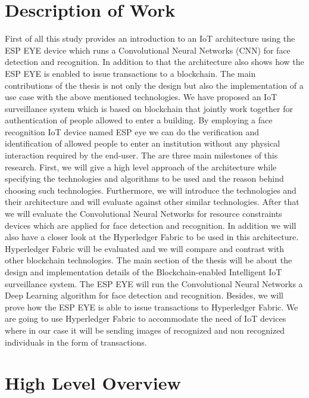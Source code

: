 \section{Description of Work}
First of all this study provides an introduction to an IoT architecture using the ESP EYE device which runs a Convolutional Neural Networks (CNN) for face detection and recognition. In addition to that the architecture also shows how the ESP EYE is enabled to issue transactions to a blockchain. The main contributions of the thesis is not only the design but also the implementation of a use case with the above mentioned technologies. We have proposed an IoT surveillance system which is based on blockchain that jointly work together for authentication of people allowed to enter a building. By employing a face recognition IoT device named ESP eye we can do the verification and identification of allowed people to enter an institution without any physical interaction required by the end-user. The are three main milestones of this research. First, we will give a high level approach of the architecture while specifying the technologies and algorithms to be used and the reason behind choosing such technologies. Furthermore, we will introduce the technologies and their architecture and will evaluate against other similar technologies. After that we will evaluate the Convolutional Neural Networks for resource constraints devices which are applied for face detection and recognition. In addition we will also have a closer look at the Hyperledger Fabric to be used in this architecture. Hyperledger Fabric will be evaluated and we will compare and contrast with other blockchain technologies. 
The main section of the thesis will be about the design and implementation details of the Blockchain-enabled Intelligent IoT surveillance system. The ESP EYE will run the Convolutional Neural Networks a Deep Learning algorithm for face detection and recognition. Besides, we will prove how the ESP EYE is able to issue transactions to Hyperledger Fabric. We are going to use Hyperledger Fabric to accommodate the need of IoT devices where in our case it will be sending images of recognized and non recognized individuals in the form of transactions. 



\section{High Level Overview}


